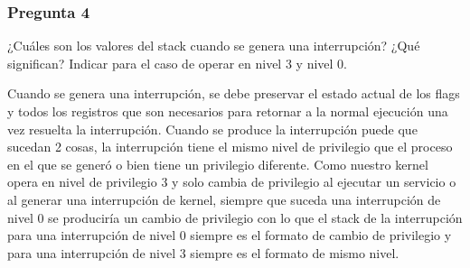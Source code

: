 \documentclass[10pt, a4paper]{article}
\begin{document}
\subsubsection*{Pregunta 4}
 \begin{framed}
¿Cuáles son los valores del stack cuando se genera una interrupción? ¿Qué significan? Indicar para el caso de operar en nivel 3 y nivel 0.
\end{framed}
Cuando se genera una interrupción, se debe preservar el estado actual de los flags y todos los registros que son necesarios para retornar a la normal ejecución una vez resuelta la interrupción.
Cuando se produce la interrupción puede que sucedan 2 cosas, la interrupción tiene el mismo nivel de privilegio que el proceso en el que se generó o bien tiene un privilegio diferente. Como nuestro kernel opera en nivel de privilegio 3 y solo cambia de privilegio al ejecutar un servicio o al generar una interrupción de kernel, siempre que suceda una interrupción de nivel 0 se produciría un cambio de privilegio con lo que el stack de la interrupción para una interrupción de nivel 0 siempre es el formato de cambio de privilegio y para una interrupción de nivel 3 siempre es el formato de mismo nivel.

\end{document}
